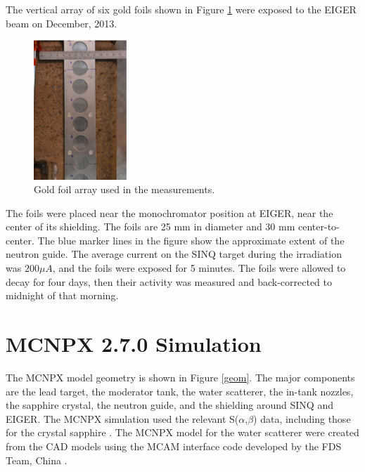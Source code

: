 \documentclass[a4paper,
              ]{jacow}
\begin{document}
The vertical array of six gold foils shown in Figure \ref{foils} were exposed to the EIGER beam on December, 2013.   

\begin{figure}[!htb]
   \centering
   \includegraphics*[width=35mm]{graphics/foils.eps}
   \caption{Gold foil array used in the measurements.}
   \label{foils}
\end{figure}

The foils were placed near the monochromator position at EIGER, near the center of its shielding.  The foils are 25 mm in diameter and 30 mm center-to-center.  The blue marker lines in the figure show the approximate extent of the neutron guide.  The average current on the SINQ target during the irradiation was $200 \mu A$, and the foils were exposed for 5 minutes.  The foils were allowed to decay for four days, then their activity was measured and back-corrected to midnight of that morning.


\section{MCNPX 2.7.0 Simulation}

The MCNPX model geometry is shown in Figure \ref{geom}.  The major components are the lead target, the moderator tank, the water scatterer, the in-tank nozzles, the sapphire crystal, the neutron guide, and the shielding around SINQ and EIGER.  The MCNPX simulation used the relevant S($\alpha$,$\beta$) data, including those for the crystal sapphire \cite{sapp}.  The MCNPX model for the water scatterer were created from the CAD models using the MCAM interface code developed by the FDS Team, China \cite{mcam}.
\end{document}
